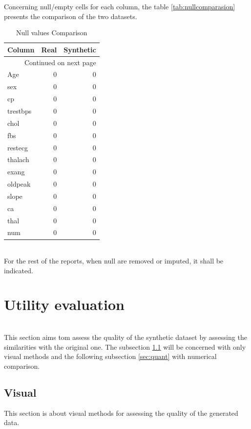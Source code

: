 \documentclass{article}
\begin{document}
Concerning null/empty cells for each column, the table \ref{tab:nullcomparasion} presents the comparison of the two datasets.\\

\begin{longtable}{lrr}
\caption{Null values Comparison}\label{tab:nullcomparison}\\
\toprule
   Column & Real & Synthetic \\
\midrule
\endhead
\midrule
\multicolumn{3}{r}{{Continued on next page}} \\
\midrule
\endfoot

\bottomrule
\endlastfoot
      Age &    0 &         0 \\
      sex &    0 &         0 \\
       cp &    0 &         0 \\
 trestbps &    0 &         0 \\
     chol &    0 &         0 \\
      fbs &    0 &         0 \\
  restecg &    0 &         0 \\
  thalach &    0 &         0 \\
    exang &    0 &         0 \\
  oldpeak &    0 &         0 \\
    slope &    0 &         0 \\
       ca &    0 &         0 \\
     thal &    0 &         0 \\
      num &    0 &         0 \\
\end{longtable}
\\

For the rest of the reports, when null are removed or imputed, it shall be indicated.
\section{Utility evaluation}\\
This section aims tom assess the quality of the synthetic dataset by assessing the similarities with the original one. The subsection \ref{sec:visual} will be concerned with only visual methods and the following subsection \ref{sec:quant} with numerical comparison.\\
\subsection{Visual}  \label{sec:visual}
This section is about visual methods for assessing the quality of the generated data.\\
\end{document}
